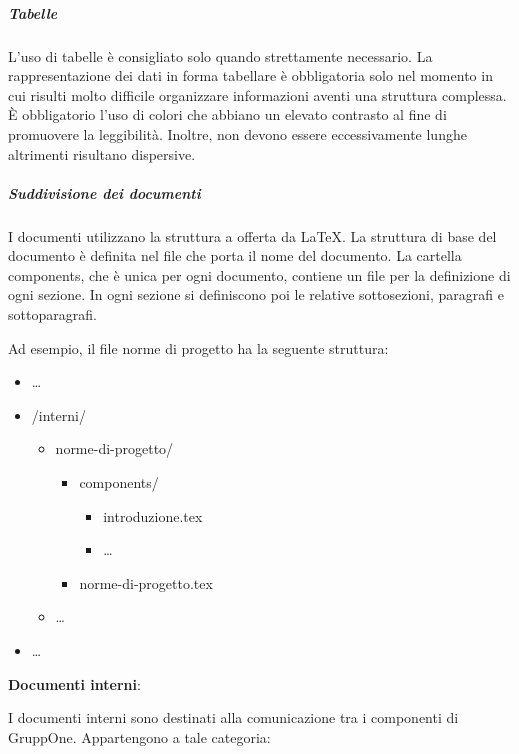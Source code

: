 \documentclass[../../norme-di-progetto.tex]{subfiles}
\begin{document}
\subparagraph{Tabelle}%
\label{subp:tabelle}
L'uso di tabelle è consigliato solo quando strettamente necessario. La rappresentazione dei dati in forma tabellare è obbligatoria solo nel momento in cui risulti molto difficile organizzare informazioni aventi una struttura complessa. È obbligatorio l'uso di colori che abbiano un elevato contrasto al fine di promuovere la leggibilità. Inoltre, non devono essere eccessivamente lunghe altrimenti risultano dispersive.

\subparagraph{Suddivisione dei documenti}%
\label{subp:suddivisione_dei_documenti}

I documenti utilizzano la struttura a  offerta da \LaTeX.
La struttura di base del documento è definita nel file che porta il nome del documento.
La cartella components, che è unica per ogni documento, contiene un file per la definizione di ogni sezione. In ogni sezione si definiscono poi le relative sottosezioni, paragrafi e sottoparagrafi.

Ad esempio, il file norme di progetto ha la seguente struttura:

\begin{itemize}
  \item[] \ldots
  \item[] /interni/
        \begin{itemize}
          \item[] norme-di-progetto/
                \begin{itemize}
                  \item[] components/
                        \begin{itemize}
                          \item[] introduzione.tex
                          \item[] \ldots
                        \end{itemize}
                  \item[] norme-di-progetto.tex
                \end{itemize}
          \item[] \ldots
        \end{itemize}
  \item[] \ldots
\end{itemize}


\textbf{Documenti interni}:

I documenti interni sono destinati alla comunicazione tra i componenti di GruppOne. Appartengono a tale categoria:
\end{document}

